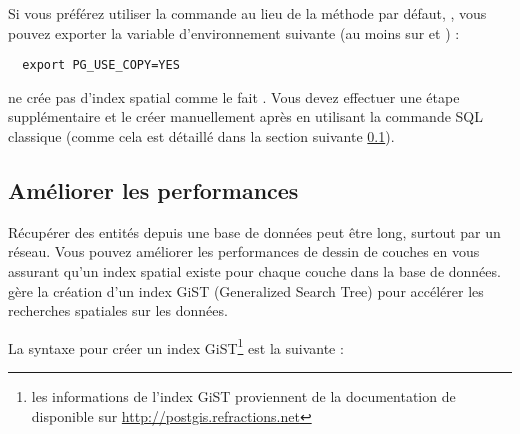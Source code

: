 Si vous préférez utiliser la commande \psq {} au lieu de la 
méthode par défaut, , vous pouvez exporter la variable 
d'environnement suivante (au moins sur \nix et \osx) :
\begin{verbatim}
  export PG_USE_COPY=YES
\end{verbatim}

 ne crée pas d'index spatial comme le fait . 
Vous devez effectuer une étape supplémentaire et le créer manuellement après en 
utilisant la commande SQL classique  (comme cela est 
détaillé dans la section suivante \ref{label_improve}).

\subsection{Améliorer les performances} \label{label_improve}

Récupérer des entités depuis une base de données \psq peut être long, surtout par 
un réseau. Vous pouvez améliorer les performances de dessin de couches \psq en 
vous assurant qu'un  index spatial existe pour 
chaque couche dans la base de données. \pg gère la création d'un index 
 GiST (Generalized Search Tree) pour 
accélérer les recherches spatiales sur les données.

La syntaxe pour créer un index GiST\footnote{les informations de l'index GiST 
proviennent de la documentation de \pg disponible sur \url{http://postgis.refractions.net}} est la suivante :

